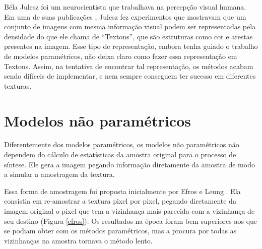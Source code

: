 

Béla Julesz foi um neurocientista que
trabalhava na percepção visual humana.
Em uma de suas publicações \cite{Julesz1981},
Julesz fez experimentos que mostravam
que um conjunto de imagens com mesma
informação visual podem ser representadas
pela densidade do que ele chama de
``Textons'', que são estruturas
como cor e arestas presentes na imagem.
Esse tipo de representação, embora tenha
guiado o trabalho de modelos paramétricos,
não deixa claro como fazer essa representação
em Textons. Assim, na tentativa de encontrar
tal representação, os métodos acabam sendo
difíceis de implementar, e nem sempre
conseguem ter sucesso em diferentes texturas.





\section{Modelos não paramétricos}


Diferentemente dos modelos paramétricos,
os modelos não paramétricos não dependem
do cálculo de
estatísticas da amostra original para
o processo de síntese. Ele gera a imagem
pegando informação diretamente da
amostra de modo a simular a amostragem
da textura.

Essa forma de amostragem foi proposta
inicialmente por Efros e Leung \cite{Efros1999}.
Ela consistia em re-amostrar a textura
pixel por pixel, pegando diretamente
da imagem original o pixel que tem
a vizinhança mais parecida com a vizinhança
de seu destino (Figura \ref{efros}). Os resultados na época
foram bem superiores aos que se podiam
obter com os métodos paramétricos,
mas a procura por todas as vizinhanças
na amostra tornava o método lento.

